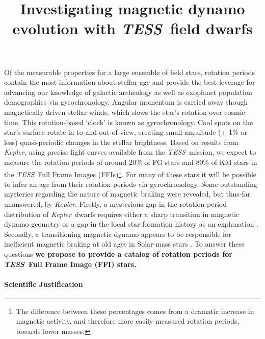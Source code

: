 \documentclass[letterpaper,12pt,preprint]{hack_aastex}
\newcommand{\Kepler}{{\it Kepler}}
\newcommand{\kepler}{\Kepler}
\newcommand{\TESS}{{\it TESS}}
\newcommand{\tess}{{\it TESS}}
\begin{document}
\title{Investigating magnetic dynamo evolution with \TESS\ field dwarfs}

Of the measurable properties for a large ensemble of field stars, rotation
periods contain the most information about stellar age and provide the best
leverage for advancing our knowledge of galactic archeology as well as
exoplanet population demographics via gyrochronology.
Angular momentum is carried away though magnetically driven stellar winds,
which slows the star's rotation over cosmic time.
This rotation-based `clock' is known as gyrochronology.
Cool spots on the star's surface rotate in-to and out-of view, creating small
amplitude ($\pm$ 1\% or less) quasi-periodic changes in the stellar
brightness.
Based on results from \Kepler, using precise light curves available from the
\TESS\ mission, we expect to measure the rotation periods of around 20\% of FG
stars and 80\% of KM stars in the \tess\ Full Frame Images (FFIs)\footnote{The
difference between these percentages comes from a dramatic increase in
magnetic activity, and therefore more easily measured rotation periods,
towards lower masses.}.
For many of these stars it will be possible to infer an age from their
rotation periods via gyrochronology.
Some outstanding mysteries regarding the nature of magnetic braking were
revealed, but thus-far unanswered, by \kepler.
Firstly, a mysterious gap in the rotation period distribution of \Kepler\
dwarfs requires either a sharp transition in magnetic dynamo geometry or a gap
in the local star formation history as an explanation \citep{mcquillan2014,
davenport2017}.
Secondly, a transitioning magnetic dynamo appears to be responsible for
inefficient magnetic braking at old ages in Solar-mass stars
\citep{van-saders2016}.
To answer these questions {\bf we propose to provide a catalog of rotation
periods for \TESS\ Full Frame Image (FFI) stars.}

\paragraph{Scientific Justification}
\end{document}
